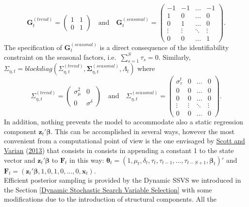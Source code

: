 \documentclass[
  12pt,
]{book}
\theoremstyle{break}
\theoremstyle{nonumberplain}
\begin{document}
\[
\boldsymbol{G}_{t}^{(trend)}=\begin{pmatrix} 
1 & 1\\
0 & 1      
\end{pmatrix} \quad \text{and} \quad \boldsymbol{G}_{t}^{(seasonal)}=\begin{pmatrix}
-1 & -1 & ... & -1 \\
1 & 0 & ...& 0 \\
0 & 1 & ... & 0 \\
\vdots & \vdots & \ddots & \vdots \\
0 & 0 & ... & 1
\end{pmatrix}.
\] The specification of \(\boldsymbol{G}_{t}^{(seasonal)}\) is a direct
consequence of the identifiability constraint on the seasonal factors,
i.e.~\(\sum_{s=1}^{S}\tau_{s}=0\). Similarly,
\(\Sigma_{\eta,t}=blockdiag(\Sigma_{\eta,t}^{(trend)},\boldsymbol{\Sigma}_{\eta,t}^{(seasonal)},\Lambda_{t})\)
where \[
\Sigma_{\eta,t}^{(trend)}=\begin{pmatrix} 
\sigma^{2}_{\mu} & 0\\
0 & \sigma^{\delta}      
\end{pmatrix} \quad \text{and} \quad \Sigma_{\eta,t}^{(seasonal)}=\begin{pmatrix}
\sigma^{t}_{\tau} & 0 & ... & 0 \\
0 & 0 & ...& 0 \\
0 & 0 & ... & 0 \\
\vdots & \vdots & \ddots & \vdots \\
0 & 0 & ... & 0
\end{pmatrix}.
\] In addition, nothing prevents the model to accommodate also a static
regression component \(\boldsymbol{z}_t'\boldsymbol{\beta}\). This can
be accomplished in several ways, however the most convenient from a
computational point of view is the one envisaged by
\protect\hyperlink{ref-scott_varian_2013}{Scott and Varian}
(\protect\hyperlink{ref-scott_varian_2013}{2013}) that consists in
consists in appending a constant 1 to the state vector and
\(\boldsymbol{z}_{t}'\boldsymbol{\beta}\) to \(\boldsymbol{F}_t\) in
this way:
\(\boldsymbol{\theta}_{t}=(1,\mu_{t},\delta_{t},\tau_{t},\tau_{t-1},...,\tau_{t-S+1},\boldsymbol{\beta}_{t})'\)
and
\(\boldsymbol{F}_{t}=(\boldsymbol{z}_{t}'\boldsymbol{\beta},1,0,1,0,...,0,\boldsymbol{x}_{t})\).\\
Efficient posterior sampling is provided by the Dynamic SSVS we
introduced in the Section
\ref{Dynamic Stochastic Search Variable Selection} with some
modifications due to the introduction of structural components. All the
\end{document}
